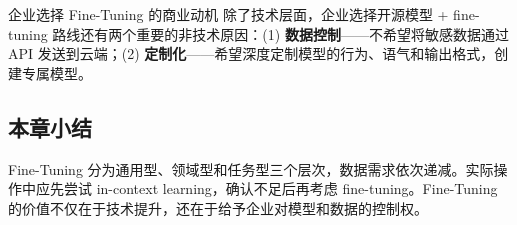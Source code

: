 \begin{knowledgebox}{企业选择 Fine-Tuning 的商业动机}
除了技术层面，企业选择开源模型 + fine-tuning 路线还有两个重要的非技术原因：(1) \textbf{数据控制}——不希望将敏感数据通过 API 发送到云端；(2) \textbf{定制化}——希望深度定制模型的行为、语气和输出格式，创建专属模型。
\end{knowledgebox}

\subsection{本章小结}

Fine-Tuning 分为通用型、领域型和任务型三个层次，数据需求依次递减。实际操作中应先尝试 in-context learning，确认不足后再考虑 fine-tuning。Fine-Tuning 的价值不仅在于技术提升，还在于给予企业对模型和数据的控制权。

\newpage
